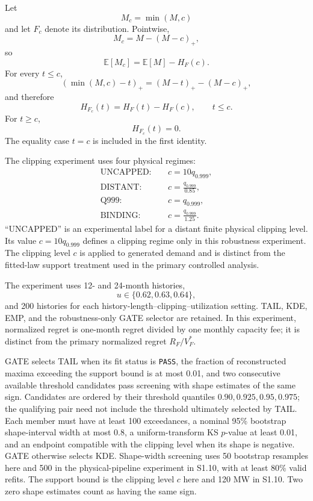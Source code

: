 \documentclass[]{interact}
\begin{document}
Let
\[
M_c=\min(M,c)
\]
and let \(F_c\) denote its distribution. Pointwise,
\[
M_c=M-(M-c)_+,
\]
so
\[
\mathbb E[M_c]
=
\mathbb E[M]-H_F(c).
\]
For every \(t\leq c\),
\[
(\min(M,c)-t)_+
=
(M-t)_+-(M-c)_+,
\]
and therefore
\[
H_{F_c}(t)
=
H_F(t)-H_F(c),
\qquad
t\leq c.
\]
For \(t\geq c\),
\[
H_{F_c}(t)=0.
\]
The equality case \(t=c\) is included in the first identity.

The clipping experiment uses four physical regimes:
\[
\begin{aligned}
\mathrm{UNCAPPED}:&
\quad c=10q_{0.999},
\\
\mathrm{DISTANT}:&
\quad c=\frac{q_{0.999}}{0.85},
\\
\mathrm{Q999}:&
\quad c=q_{0.999},
\\
\mathrm{BINDING}:&
\quad c=\frac{q_{0.999}}{1.25}.
\end{aligned}
\]
``UNCAPPED'' is an experimental label for a distant finite physical
clipping level. Its value \(c=10q_{0.999}\) defines a clipping regime
only in this robustness experiment. The clipping level \(c\) is
applied to generated demand and is distinct from the fitted-law support
treatment used in the primary controlled analysis.

The experiment uses 12- and 24-month histories,
\[
u\in\{0.62,0.63,0.64\},
\]
and 200 histories for each
history-length--clipping--utilization setting. TAIL, KDE, EMP, and the
robustness-only GATE selector are retained. In this experiment, normalized regret is one-month regret divided by
one monthly capacity fee;
it is distinct from the primary normalized regret \(R_F/V_F^\ast\).

GATE selects TAIL when its fit status is \texttt{PASS}, the fraction
of reconstructed maxima exceeding the support bound is at most 0.01,
and two consecutive available threshold candidates pass screening
with shape estimates of the same sign. Candidates are ordered by
their threshold quantiles \(0.90,0.925,0.95,0.975\); the qualifying
pair need not include the threshold ultimately selected by TAIL.
Each member must have at least 100 exceedances, a nominal 95\%
bootstrap shape-interval width at most 0.8, a uniform-transform KS
\(p\)-value at least 0.01, and an endpoint compatible with the clipping level when its
shape is negative. GATE otherwise selects KDE.
Shape-width screening uses 50 bootstrap resamples here and 500 in
the physical-pipeline experiment in S1.10, with at least 80\% valid refits.
The support bound is the clipping level \(c\) here and 120 MW in
S1.10. Two zero shape estimates count as having the same sign.
\end{document}
